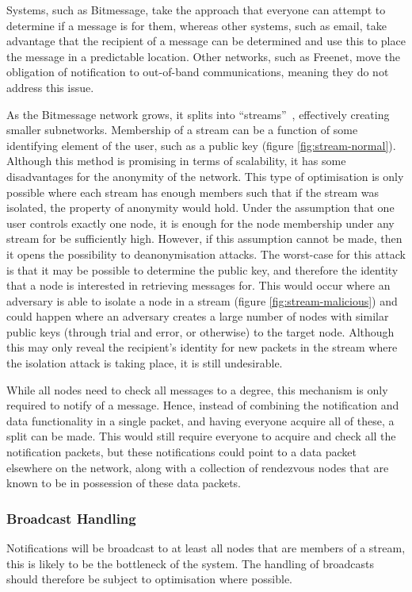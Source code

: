 			Systems, such as Bitmessage, take the approach that everyone can attempt to determine if a message is for them, whereas other systems, such as email, take advantage that the recipient of a message can be determined and use this to place the message in a predictable location. Other networks, such as Freenet, move the obligation of notification to out-of-band communications, meaning they do not address this issue.
			
			As the Bitmessage network grows, it splits into ``streams''~\cite{bitmsg}, effectively creating smaller subnetworks. Membership of a stream can be a function of some identifying element of the user, such as a public key (figure \ref{fig:stream-normal}). Although this method is promising in terms of scalability, it has some disadvantages for the anonymity of the network. This type of optimisation is only possible where each stream has enough members such that if the stream was isolated, the property of anonymity would hold. Under the assumption that one user controls exactly one node, it is enough for the node membership under any stream for be sufficiently high. However, if this assumption cannot be made, then it opens the possibility to deanonymisation attacks. The worst-case for this attack is that it may be possible to determine the public key, and therefore the identity that a node is interested in retrieving messages for. This would occur where an adversary is able to isolate a node in a stream (figure \ref{fig:stream-malicious}) and could happen where an adversary creates a large number of nodes with similar public keys (through trial and error, or otherwise) to the target node. Although this may only reveal the recipient's identity for new packets in the stream where the isolation attack is taking place, it is still undesirable.
			
			
			
			While all nodes need to check all messages to a degree, this mechanism is only required to notify of a message. Hence, instead of combining the notification and data functionality in a single packet, and having everyone acquire all of these, a split can be made. This would still require everyone to acquire and check all the notification packets, but these notifications could point to a data packet elsewhere on the network, along with a collection of rendezvous nodes that are known to be in possession of these data packets.
			
			\subsubsection{Broadcast Handling}
			Notifications will be broadcast to at least all nodes that are members of a stream, this is likely to be the bottleneck of the system. The handling of broadcasts should therefore be subject to optimisation where possible.

